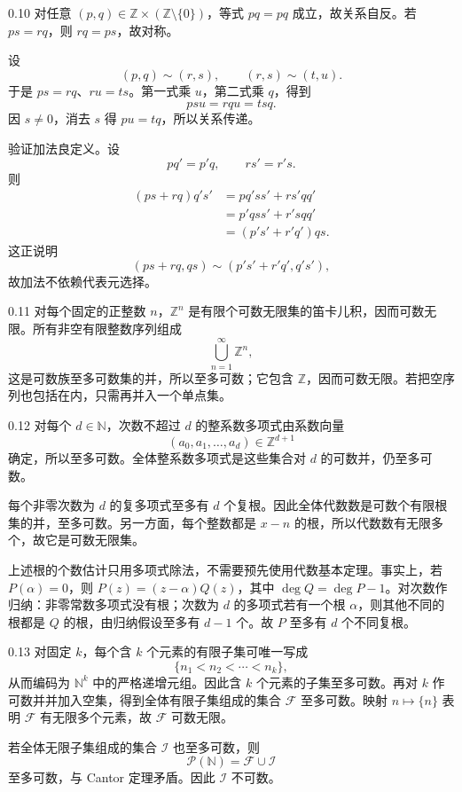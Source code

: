 \begin{solution}{0.10}
对任意 \((p,q)\in\mathbb Z\times(\mathbb Z\setminus\{0\})\)，等式 \(pq=pq\) 成立，故关系自反。若 \(ps=rq\)，则 \(rq=ps\)，故对称。

设
\[
  (p,q)\sim(r,s),\qquad (r,s)\sim(t,u).
\]
于是 \(ps=rq\)、\(ru=ts\)。第一式乘 \(u\)，第二式乘 \(q\)，得到
\[
  psu=rqu=tsq.
\]
因 \(s\ne0\)，消去 \(s\) 得 \(pu=tq\)，所以关系传递。

验证加法良定义。设
\[
  pq'=p'q,\qquad rs'=r's.
\]
则
\[
\begin{aligned}
(ps+rq)q's'
&=p q' s s'+r s' q q'\\
&=p' q s s'+r' s q q'\\
&=(p's'+r'q')qs.
\end{aligned}
\]
这正说明
\[
  (ps+rq,qs)\sim(p's'+r'q',q's'),
\]
故加法不依赖代表元选择。
\end{solution}

\begin{solution}{0.11}
对每个固定的正整数 \(n\)，\(\mathbb Z^n\) 是有限个可数无限集的笛卡儿积，因而可数无限。所有非空有限整数序列组成
\[
  \bigcup_{n=1}^{\infty}\mathbb Z^n,
\]
这是可数族至多可数集的并，所以至多可数；它包含 \(\mathbb Z\)，因而可数无限。若把空序列也包括在内，只需再并入一个单点集。
\end{solution}

\begin{solution}{0.12}
对每个 \(d\in\mathbb N\)，次数不超过 \(d\) 的整系数多项式由系数向量
\[
  (a_0,a_1,\ldots,a_d)\in\mathbb Z^{d+1}
\]
确定，所以至多可数。全体整系数多项式是这些集合对 \(d\) 的可数并，仍至多可数。

每个非零次数为 \(d\) 的复多项式至多有 \(d\) 个复根。因此全体代数数是可数个有限根集的并，至多可数。另一方面，每个整数都是 \(x-n\) 的根，所以代数数有无限多个，故它是可数无限集。

上述根的个数估计只用多项式除法，不需要预先使用代数基本定理。事实上，若 \(P(\alpha)=0\)，则 \(P(z)=(z-\alpha)Q(z)\)，其中 \(\deg Q=\deg P-1\)。对次数作归纳：非零常数多项式没有根；次数为 \(d\) 的多项式若有一个根 \(\alpha\)，则其他不同的根都是 \(Q\) 的根，由归纳假设至多有 \(d-1\) 个。故 \(P\) 至多有 \(d\) 个不同复根。
\end{solution}

\begin{solution}{0.13}
对固定 \(k\)，每个含 \(k\) 个元素的有限子集可唯一写成
\[
  \{n_1<n_2<\cdots<n_k\},
\]
从而编码为 \(\mathbb N^k\) 中的严格递增元组。因此含 \(k\) 个元素的子集至多可数。再对 \(k\) 作可数并并加入空集，得到全体有限子集组成的集合 \(\mathcal F\) 至多可数。映射 \(n\mapsto\{n\}\) 表明 \(\mathcal F\) 有无限多个元素，故 \(\mathcal F\) 可数无限。

若全体无限子集组成的集合 \(\mathcal I\) 也至多可数，则
\[
  \mathcal P(\mathbb N)=\mathcal F\cup\mathcal I
\]
至多可数，与 Cantor 定理矛盾。因此 \(\mathcal I\) 不可数。
\end{solution}

